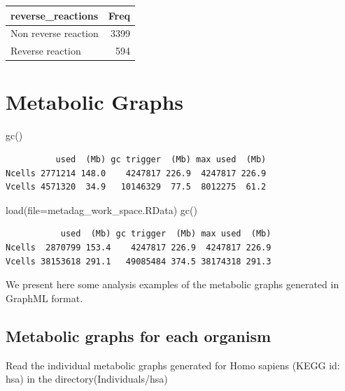 \documentclass[
  letterpaper,
  DIV=11,
  numbers=noendperiod]{scrreprt}
\newenvironment{Shaded}{}{}
\newcommand{\AttributeTok}[1]{\textcolor[rgb]{0.78,0.47,0.87}{#1}}
\newcommand{\FunctionTok}[1]{\textcolor[rgb]{0.38,0.69,0.94}{#1}}
\newcommand{\NormalTok}[1]{\textcolor[rgb]{0.67,0.70,0.75}{#1}}
\newcommand{\StringTok}[1]{\textcolor[rgb]{0.60,0.76,0.47}{#1}}
\begin{document}
\begin{longtable*}[l]{lr}
\toprule
reverse\_reactions & Freq\\
\midrule
Non reverse reaction & 3399\\
Reverse reaction & 594\\
\bottomrule
\end{longtable*}


\chapter{Metabolic Graphs}\label{metabolic-graphs}

\begin{Shaded}
\begin{Highlighting}[]
\FunctionTok{gc}\NormalTok{()}
\end{Highlighting}
\end{Shaded}

\begin{verbatim}
          used  (Mb) gc trigger  (Mb) max used  (Mb)
Ncells 2771214 148.0    4247817 226.9  4247817 226.9
Vcells 4571320  34.9   10146329  77.5  8012275  61.2
\end{verbatim}

\begin{Shaded}
\begin{Highlighting}[]
\FunctionTok{load}\NormalTok{(}\AttributeTok{file=}\StringTok{\textquotesingle{}metadag\_work\_space.RData\textquotesingle{}}\NormalTok{)}
\FunctionTok{gc}\NormalTok{()}
\end{Highlighting}
\end{Shaded}

\begin{verbatim}
           used  (Mb) gc trigger  (Mb) max used  (Mb)
Ncells  2870799 153.4    4247817 226.9  4247817 226.9
Vcells 38153618 291.1   49085484 374.5 38174318 291.3
\end{verbatim}

We present here some analysis examples of the metabolic graphs generated
in GraphML format.

\section{Metabolic graphs for each
organism}\label{metabolic-graphs-for-each-organism}

Read the individual metabolic graphs generated for Homo sapiens (KEGG
id: hsa) in the directory(Individuals/hsa)
\end{document}
